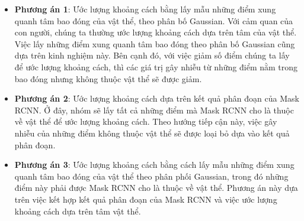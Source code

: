 \begin{itemize}


\item \textbf{Phương án 1}: Ước lượng khoảng cách bằng lấy mẫu những điểm  xung quanh tâm bao đóng của vật thể, theo phân bố Gaussian. Với cảm quan của con người, chúng ta thường ước lượng khoảng cách dựa trên tâm của vật thể. Việc lấy những điểm xung quanh tâm bao đóng theo phân bố Gaussian cũng dựa trên kinh nghiệm này. Bên cạnh đó, với việc giảm số điểm chúng ta lấy để ước lượng khoảng cách, thì các giá trị gây nhiễu từ những điểm nằm trong bao đóng nhưng không thuộc vật thể sẽ được giảm.

\item \textbf{Phương án 2}: Ước lượng khoảng cách dựa trên kết quả phân đoạn của Mask RCNN. Ở đây, nhóm sẽ lấy tất cả những điểm  mà Mask RCNN cho là thuộc về vật thể để ước lượng khoảng cách. Theo hướng tiếp cận này, việc gây nhiễu của những điểm không thuộc vật thể sẽ được loại bỏ dựa vào kết quả phân đoạn.

\item \textbf{Phương án 3}: Ước lượng khoảng cách bằng cách lấy mẫu những điểm xung quanh tâm bao đóng của vật thể theo phân phối Gaussian, trong đó những điểm này phải được Mask RCNN cho là thuộc về vật thể. Phương án này dựa trên việc kết hợp kết quả phân đoạn của Mask RCNN và việc ước lượng khoảng cách dựa trên tâm vật thể.  

\end{itemize}



